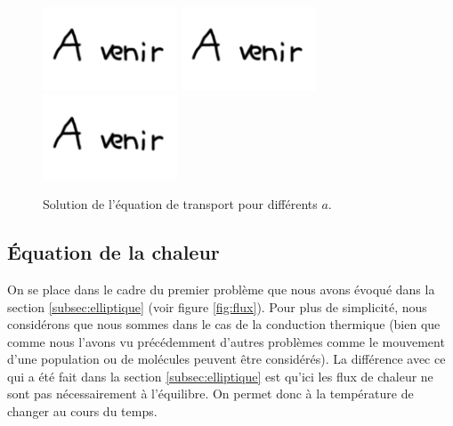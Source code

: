 \documentclass[12pt,a4paper,twoside]{article}
\begin{document}
\begin{figure}[h]
  \centering
  \includegraphics[width = 4cm]{Figures/A_venir.png}
  \includegraphics[width = 4cm]{Figures/A_venir.png}
  \includegraphics[width = 4cm]{Figures/A_venir.png}
  \caption{Solution de l'\'equation de transport
  pour diff\'erents $a$.}
  \label{fig:transport_a}
\end{figure}


\subsection{\'Equation de la chaleur}

On se place dans le cadre du premier probl\`eme que nous avons \'evoqu\'e dans
la section \ref{subsec:elliptique} (voir figure \ref{fig:flux}). 
Pour plus de simplicit\'e, nous consid\'erons que nous sommes dans le cas
de la conduction thermique (bien que comme nous l'avons vu pr\'ec\'edemment
d'autres probl\`emes comme le mouvement d'une population ou de mol\'ecules
peuvent \^etre consid\'er\'es).
La diff\'erence avec ce qui a \'et\'e fait dans la section \ref{subsec:elliptique}
est qu'ici les flux de chaleur ne sont pas n\'ecessairement \`a l'\'equilibre.
On permet donc \`a la temp\'erature de changer au cours du temps.
\end{document}
